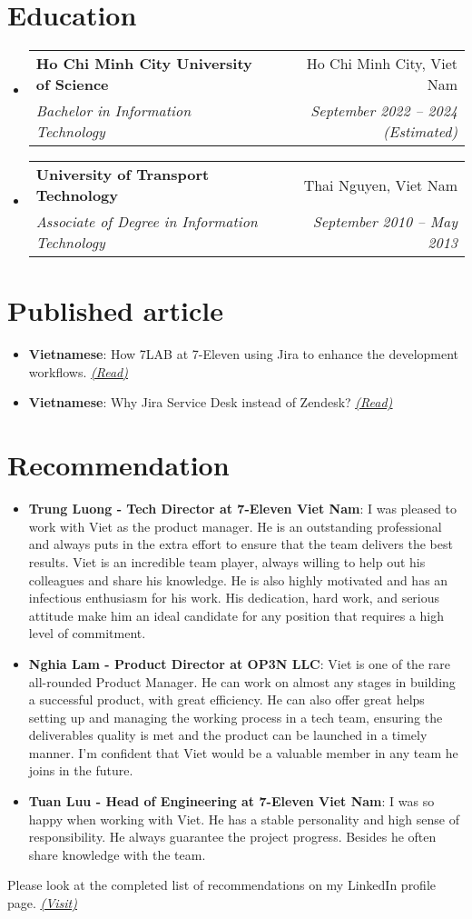 \documentclass[letterpaper,11pt]{article}
\makeatletter
\newcommand{\resumeItem}[2]{
  \item\small{
    \textbf{#1}{: #2 \vspace{-2pt}}
  }
}
\newcommand{\resumeSubheading}[4]{
  \vspace{-1pt}\item
    \begin{tabular*}{0.97\textwidth}[t]{l@{\extracolsep{\fill}}r}
      \textbf{#1} & #2 \\
      \textit{\small#3} & \textit{\small #4} \\
    \end{tabular*}\vspace{-5pt}
}
\newcommand{\resumeSubItem}[2]{\resumeItem{#1}{#2}\vspace{-4pt}}
\newcommand{\resumeSubHeadingListStart}{\begin{itemize}[leftmargin=*]}
\newcommand{\resumeSubHeadingListEnd}{\end{itemize}}
\makeatother
\begin{document}
\section{Education}
  \resumeSubHeadingListStart
    \resumeSubheading
      {Ho Chi Minh City University of Science}{Ho Chi Minh City, Viet Nam}
      {Bachelor in Information Technology}{September 2022 -- 2024 (Estimated)}
    \resumeSubheading
      {University of Transport Technology}{Thai Nguyen, Viet Nam}
      {Associate of Degree in Information Technology}{September 2010 -- May 2013}
  \resumeSubHeadingListEnd


\section{Published article}
  \resumeSubHeadingListStart
    \resumeSubItem{Vietnamese}
        {How 7LAB at 7-Eleven using Jira to enhance the development workflows. }\href{https://medium.com/7-lab/bddb5245a522}{\underline{\textit{(Read)}}}
    \resumeSubItem{Vietnamese}
        {Why Jira Service Desk instead of Zendesk?}\href{https://medium.com/7-lab/b664667aa90d}{\underline{\textit{(Read)}}}
  \resumeSubHeadingListEnd

\section{Recommendation}
    \resumeSubHeadingListStart
        \resumeSubItem{Trung Luong - Tech Director at 7-Eleven Viet Nam}
            {I was pleased to work with Viet as the product manager. He is an outstanding professional and always puts in the extra effort to ensure that the team delivers the best results. Viet is an incredible team player, always willing to help out his colleagues and share his knowledge. He is also highly motivated and has an infectious enthusiasm for his work. His dedication, hard work, and serious attitude make him an ideal candidate for any position that requires a high level of commitment.}
         \resumeSubItem{Nghia Lam - Product Director at OP3N LLC}
            {Viet is one of the rare all-rounded Product Manager. He can work on almost any stages in building a successful product, with great efficiency. He can also offer great helps setting up and managing the working process in a tech team, ensuring the deliverables quality is met and the product can be launched in a timely manner. I’m confident that Viet would be a valuable member in any team he joins in the future.}
        \resumeSubItem{Tuan Luu - Head of Engineering at 7-Eleven Viet Nam}
            {I was so happy when working with Viet. He has a stable personality and high sense of responsibility. He always guarantee the project progress. Besides he often share knowledge with the team.}
    \resumeSubHeadingListEnd
    {Please look at the completed list of recommendations on my LinkedIn profile page.} \href{https://www.linkedin.com/in/vietch2612/details/recommendations/?detailScreenTabIndex=0}{\underline{\textit{(Visit)}}}


\end{document}
